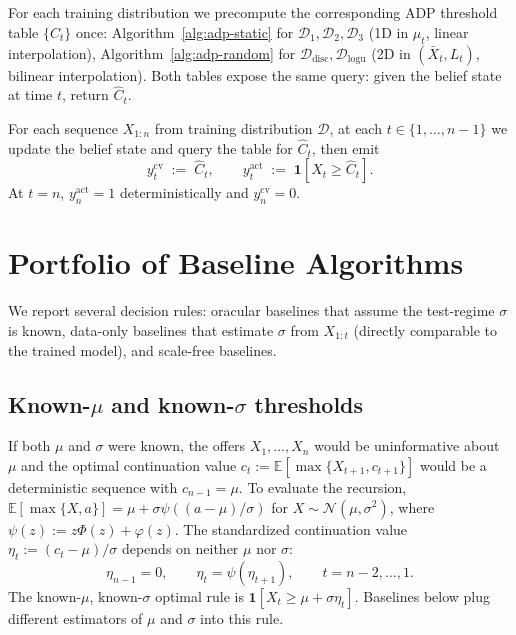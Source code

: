 \documentclass[11pt]{article}
\begin{document}
For each training distribution we precompute the corresponding ADP threshold table $\{\widehat C_t\}$ once: Algorithm~\ref{alg:adp-static} for $\mathcal{D}_1, \mathcal{D}_2, \mathcal{D}_3$ (1D in $\mu_t$, linear interpolation), Algorithm~\ref{alg:adp-random} for $\mathcal{D}_{\mathrm{disc}}, \mathcal{D}_{\mathrm{logu}}$ (2D in $(\bar X_t, L_t)$, bilinear interpolation). Both tables expose the same query: given the belief state at time $t$, return $\widehat C_t$.

For each sequence $X_{1:n}$ from training distribution $\mathcal{D}$, at each $t \in \{1, \ldots, n-1\}$ we update the belief state and query the table for $\widehat C_t$, then emit
\[
y_t^{\mathrm{cv}} \;:=\; \widehat C_t,
\qquad
y_t^{\mathrm{act}} \;:=\; \mathbf{1}[X_t \ge \widehat C_t].
\]
At $t = n$, $y_n^{\mathrm{act}} = 1$ deterministically and $y_n^{\mathrm{cv}} = 0$.

\section{Portfolio of Baseline Algorithms}
\label{sec:baselines}

We report several decision rules: oracular baselines that assume the test-regime $\sigma$ is known, data-only baselines that estimate $\sigma$ from $X_{1:t}$ (directly comparable to the trained model), and scale-free baselines.

\subsection{Known-$\mu$ and known-$\sigma$ thresholds}
\label{sec:known-mu-sigma}

If both $\mu$ and $\sigma$ were known, the offers $X_1, \ldots, X_n$ would be uninformative about $\mu$ and the optimal continuation value $c_t := \mathbb{E}[\max\{X_{t+1}, c_{t+1}\}]$ would be a deterministic sequence with $c_{n-1} = \mu$. To evaluate the recursion, $\mathbb{E}[\max\{X, a\}] = \mu + \sigma\psi((a - \mu)/\sigma)$ for $X \sim \mathcal{N}(\mu, \sigma^2)$, where $\psi(z) := z\Phi(z) + \varphi(z)$. The standardized continuation value $\eta_t := (c_t - \mu)/\sigma$ depends on neither $\mu$ nor $\sigma$:
\begin{equation}
\label{eq:eta}
\eta_{n-1} = 0, \qquad \eta_t = \psi(\eta_{t+1}), \qquad t = n-2, \ldots, 1.
\end{equation}
The known-$\mu$, known-$\sigma$ optimal rule is $\mathbf{1}[X_t \ge \mu + \sigma\eta_t]$. Baselines below plug different estimators of $\mu$ and $\sigma$ into this rule.
\end{document}
